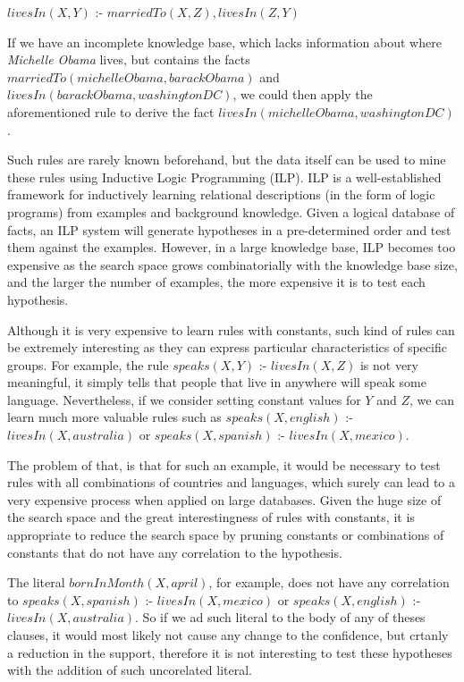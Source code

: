 \begin{center}
  $livesIn(X,Y)$ :- $marriedTo(X,Z),livesIn(Z,Y)$
\end{center}

If we have an incomplete knowledge base, which lacks information about where \emph{Michelle Obama} lives, but
contains the facts $marriedTo(michelleObama,barackObama)$ and $livesIn(barackObama,washingtonDC)$, we could then
apply the aforementioned rule to derive the fact $livesIn(michelleObama, washingtonDC)$. 



Such rules are rarely known beforehand, but the data itself can be used to mine these rules using Inductive Logic
Programming (ILP). ILP is a well-established framework for inductively learning relational descriptions (in the form
of logic programs) from examples and background knowledge. Given a logical database of facts, an ILP system will
generate hypotheses in a pre-determined order and test them against the examples. However, in a large knowledge base,
ILP becomes too expensive as the search space grows combinatorially with the knowledge base size, and the larger the
number of examples, the more expensive it is to test each hypothesis.

Although it is very expensive to learn rules with constants, such kind of rules can be extremely interesting as they
can express particular characteristics of specific groups. For example, the rule $speaks(X,Y)$ :- $livesIn(X,Z)$ is not
very meaningful, it simply tells that people that live in anywhere will speak some language. Nevertheless, if we
consider setting constant values for $Y$ and $Z$, we can learn much more valuable rules such as
$speaks(X,english)$ :- $livesIn(X,australia)$ or $speaks(X,spanish)$ :- $livesIn(X,mexico)$.

The problem of that, is that for such an example, it would be necessary to test rules with all combinations of
countries and languages, which surely can lead to a very expensive process when applied on large databases. Given the
huge size of the search space and the great interestingness of rules with constants, it is appropriate to reduce the
search space by pruning constants or combinations of constants that do not have any correlation to the
hypothesis.

The literal $bornInMonth(X,april)$, for example, does not have any correlation  to $speaks(X,spanish )$ :-
$livesIn(X,mexico)$ or $speaks(X,english)$ :- $livesIn(X,australia)$. So if we ad such literal to the body of any of
theses clauses, it would most likely not cause any change to the confidence,  but crtanly a reduction in the support,
therefore it is not interesting to test these hypotheses with the addition of  such uncorelated literal.

